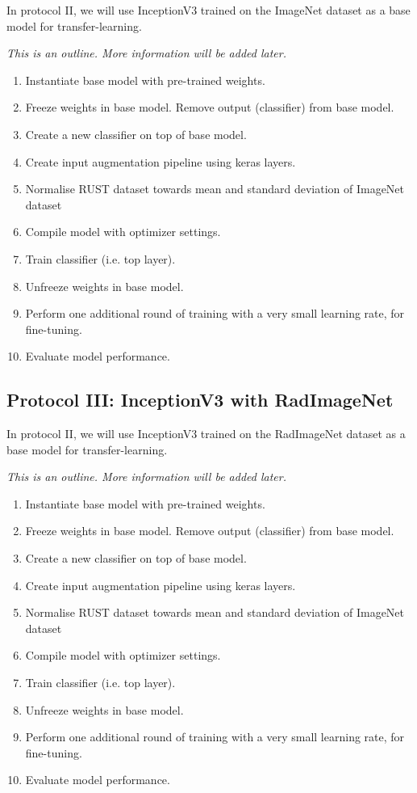 In protocol II, we will use InceptionV3 trained on the ImageNet dataset as a base model for transfer-learning.

\noindent
\emph{This is an outline. More information will be added later.}

\begin{enumerate}
    \item Instantiate base model with pre-trained weights.
    \item Freeze weights in base model. Remove output (classifier) from base model.
    \item Create a new classifier on top of base model.
    \item Create input augmentation pipeline using keras layers.
    \item Normalise RUST dataset towards mean and standard deviation of ImageNet dataset
    \item Compile model with optimizer settings.
    \item Train classifier (i.e. top layer).
    \item Unfreeze weights in base model.
    \item Perform one additional round of training with a very small learning rate, for fine-tuning.
    \item Evaluate model performance.
\end{enumerate}

\subsection{Protocol III: InceptionV3 with RadImageNet}

In protocol II, we will use InceptionV3 trained on the RadImageNet dataset as a base model for transfer-learning.

\noindent
\emph{This is an outline. More information will be added later.}

\begin{enumerate}
    \item Instantiate base model with pre-trained weights.
    \item Freeze weights in base model. Remove output (classifier) from base model.
    \item Create a new classifier on top of base model.
    \item Create input augmentation pipeline using keras layers.
    \item Normalise RUST dataset towards mean and standard deviation of ImageNet dataset
    \item Compile model with optimizer settings.
    \item Train classifier (i.e. top layer).
    \item Unfreeze weights in base model.
    \item Perform one additional round of training with a very small learning rate, for fine-tuning.
    \item Evaluate model performance.
\end{enumerate}

